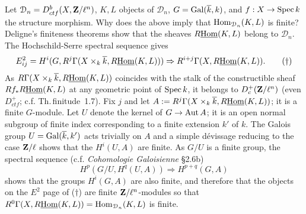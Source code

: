 \documentclass[deligne.tex]{subfiles}
\begin{document}
	Let $\mathcal D_n= D_{ctf}^b(X,\mathbf{Z}/\ell^n)$,
	$K,L$ objects of $\mathcal D_n$, $G=\operatorname{Gal}(\overline k,k)$,
	and $f:X\rightarrow\operatorname{Spec} k$ the structure morphism.
	Why does the above imply that $\operatorname{Hom}_{\mathcal D_n}(K,L)$ is finite?
	Deligne's finiteness theorems show that the sheaves
	$R\underline{\operatorname{Hom}}(K,L)$ belong to $\mathcal D_n$.
	The Hochschild-Serre spectral sequence gives
	\begin{equation*}
		E^2_{ij}=H^i(G,R^j\Gamma(X\times_k\overline k,R\underline{\operatorname{Hom}}(K,L)))\Rightarrow R^{i+j}\Gamma(X,R\underline{\operatorname{Hom}}(K,L)).\tag{$\dagger$}
	\end{equation*}
	As $R\Gamma(X\times_k\overline k,R\underline{\operatorname{Hom}}(K,L))$ coincides with
	the stalk of the constructible sheaf $Rf_*R\underline{\operatorname{Hom}}(K,L)$
	at any geometric point of $\operatorname{Spec} k$, it belongs to $D^+_{c}(\mathbf{Z}/\ell^n)$
	(even $D^+_{ctf}$; c.f. Th.\,finitude~1.7).
	Fix $j$ and let
	$A:=R^j\Gamma(X\times_k\overline k,R\underline{\operatorname{Hom}}(K,L))$; it is a finite
	$G$-module. Let $U$ denote the kernel of $G\rightarrow\operatorname{Aut} A$; it is an open
	normal subgroup of finite index corresponding to a finite extension
	$k'$ of $k$. The Galois group $U=\operatorname{Gal}(\overline k,k')$ acts trivially
	on $A$ and a simple dévissage reducing to the case $\mathbf{Z}/\ell$ shows that
	the $H^i(U,A)$ are finite. As $G/U$ is a finite group, the spectral 
	sequence (c.f. \emph{Cohomologie Galoisienne} \S2.6b)
	\begin{equation*}
		H^p(G/U,H^q(U,A))\Rightarrow H^{p+q}(G,A)
	\end{equation*}
	shows that the groups $H^i(G,A)$ are also finite, and therefore that the
	objects on the $E^2$ page of ($\dagger$) are finite $\mathbf{Z}/\ell^n$-modules
	so that $R^0\Gamma(X,R\underline{\operatorname{Hom}}(K,L))=\operatorname{Hom}_{\mathcal D_n}(K,L)$ is finite.
\end{document}
